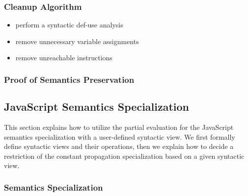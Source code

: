 \subsubsection{Cleanup Algorithm}

\todo

\begin{itemize}
  \item perform a syntactic def-use analysis
  \item remove unnecessary variable assignments
  \item remove unreachable instructions
\end{itemize}


\subsubsection{Proof of Semantics Preservation}

\todo





\subsection{JavaScript Semantics Specialization}

This section explains how to utilize the partial evaluation for the JavaScript
semantics specialization with a user-defined syntactic view.  We first formally
define syntactic views and their operations, then we explain how to decide a
restriction of the constant propagation specialization based on a given
syntactic view.

\subsubsection{Semantics Specialization}

\todo

